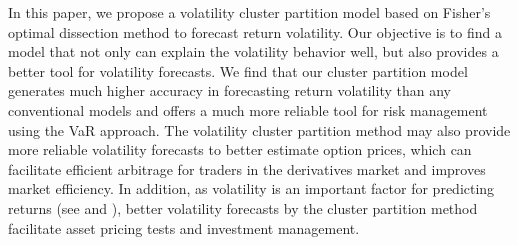 \documentclass[preprint,12pt,authoryear]{elsarticle}
\begin{document}
In this paper, we propose a volatility cluster partition model based on Fisher's optimal dissection method to forecast return volatility.
Our objective is to find a model that not only can explain the volatility behavior
well, but also provides a better tool for volatility forecasts. We find that our
cluster partition model generates much higher accuracy in forecasting return volatility than
any conventional models and offers a much more reliable tool for risk management
using the VaR approach.
The volatility cluster partition method may also provide more reliable volatility forecasts to better estimate option prices, which can facilitate efficient arbitrage for traders in the derivatives market and improves market efficiency. In addition, as volatility is an important factor for predicting returns (see \cite{Ang2006} and \cite{Chung}), better volatility forecasts by the cluster partition method facilitate asset pricing tests and investment management.
\end{document}
